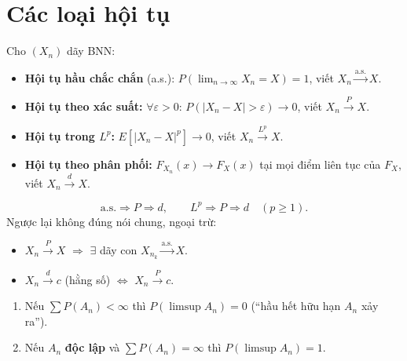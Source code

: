\documentclass[12pt,a4paper]{article}
\begin{document}
\section{Các loại hội tụ}

\begin{dinhnghia}
  Cho $(X_n)$ dãy BNN:
  \begin{itemize}
    \item \textbf{Hội tụ hầu chắc chắn} (a.s.): $P\!\left(\lim_{n \to \infty} X_n = X\right) = 1$, viết $X_n \xrightarrow{\text{a.s.}} X$.
    \item \textbf{Hội tụ theo xác suất:} $\forall \varepsilon > 0$: $P(|X_n - X| > \varepsilon) \to 0$, viết $X_n \xrightarrow{P} X$.
    \item \textbf{Hội tụ trong $L^p$:} $E[|X_n - X|^p] \to 0$, viết $X_n \xrightarrow{L^p} X$.
    \item \textbf{Hội tụ theo phân phối:} $F_{X_n}(x) \to F_X(x)$ tại mọi điểm liên tục của $F_X$, viết $X_n \xrightarrow{d} X$.
  \end{itemize}
\end{dinhnghia}

\begin{dinhly}[title={Quan hệ giữa các loại hội tụ}]
  \[
    \text{a.s.} \Rightarrow P \Rightarrow d, \qquad L^p \Rightarrow P \Rightarrow d \quad(p \ge 1).
  \]
  Ngược lại không đúng nói chung, ngoại trừ:
  \begin{itemize}
    \item $X_n \xrightarrow{P} X$ $\Rightarrow$ $\exists$ dãy con $X_{n_k} \xrightarrow{\text{a.s.}} X$.
    \item $X_n \xrightarrow{d} c$ (hằng số) $\Leftrightarrow$ $X_n \xrightarrow{P} c$.
  \end{itemize}
\end{dinhly}

\begin{dinhly}[title={Bổ đề Borel--Cantelli}]
  \begin{enumerate}
    \item Nếu $\sum P(A_n) < \infty$ thì $P(\limsup A_n) = 0$ (``hầu hết hữu hạn $A_n$ xảy ra'').
    \item Nếu $A_n$ \textbf{độc lập} và $\sum P(A_n) = \infty$ thì $P(\limsup A_n) = 1$.
  \end{enumerate}
\end{dinhly}
\end{document}
